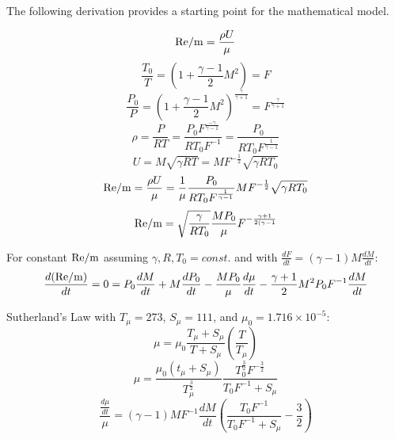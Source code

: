 The following derivation provides a starting point for the mathematical model.

\begin{equation}
    \mathrm{Re/m} = \frac{\rho U}{\mu}
\end{equation}
\begin{equation}
    \frac{T_0}{T} = (1+\frac{\gamma-1}{2}M^2) = F
\end{equation}
\begin{equation}
    \frac{P_0}{P} = (1+\frac{\gamma-1}{2}M^2)^{\frac{\gamma}{\gamma+1}} = F^{\frac{\gamma}{\gamma+1}}
\end{equation}
\begin{equation}
    \rho = \frac{P}{R T} = \frac{P_0 F^{\frac{-\gamma}{\gamma-1}}}{R T_0 F^{-1}} = \frac{P_0}{R T_0 F^{\frac{1}{\gamma-1}}}
\end{equation}
\begin{equation}
    U = M \sqrt{\gamma R T} = M F^{-\frac{1}{2}} \sqrt{\gamma R T_0}
\end{equation}
\begin{equation*}
    \mathrm{Re/m} = \frac{\rho U}{\mu} = \frac{1}{\mu} \frac{P_0}{R T_0 F^{\frac{1}{\gamma-1}}} M F^{-\frac{1}{2}} \sqrt{\gamma R T_0}
\end{equation*}
\begin{equation}
    \mathrm{Re/m} = \sqrt{\frac{\gamma}{R T_0}} \frac{M P_0}{\mu} F^{-\frac{\gamma+1}{2(\gamma -1}}
\end{equation}

For constant $\mathrm{Re/m}$ assuming $\gamma, R, T_0 = const.$ and with $\frac{dF}{dt} = (\gamma-1)M \frac{dM}{dt}$:
\begin{equation}
    \frac{d(\mathrm{Re/m})}{dt} = 0 = P_0 \frac{dM}{dt} + M \frac{dP_0}{dt} - \frac{M P_0}{\mu} \frac{d\mu}{dt} - \frac{\gamma+1}{2} M^2 P_0 F^{-1} \frac{dM}{dt}
\end{equation}

Sutherland's Law with $T_\mu = 273$, $S_\mu = 111$, and $\mu_0 = 1.716 \times 10^{-5}$:
\begin{equation}
    \mu = \mu_0 \frac{T_\mu+S_\mu}{T+S_\mu} \left( \frac{T}{T_\mu} \right)
\end{equation}
\begin{equation}
    \mu = \frac{\mu_0(t_\mu+S_\mu)}{T_\mu^{\frac{3}{2}}} \frac{T_0^{\frac{3}{2}} F^{-\frac{3}{2}}}{T_0 F^{-1}+S_\mu}
\end{equation}
\begin{equation}
    \frac{\frac{d\mu}{dt}}{\mu} = (\gamma-1) M F^{-1} \frac{dM}{dt} \left( \frac{T_0 F^{-1}}{T_0 F^{-1} + S_\mu}-\frac{3}{2} \right)
\end{equation}

